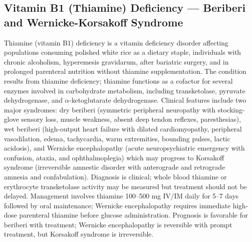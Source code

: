\subsection{Vitamin B1 (Thiamine) Deficiency --- Beriberi and Wernicke-Korsakoff Syndrome}
\label{sec:Vitamin B1 Deficiency}
Thiamine (vitamin B1) deficiency is a vitamin deficiency disorder affecting populations consuming polished white rice as a dietary staple, individuals with chronic alcoholism, hyperemesis gravidarum, after bariatric surgery, and in prolonged parenteral nutrition without thiamine supplementation. The condition results from thiamine deficiency; thiamine functions as a cofactor for several enzymes involved in carbohydrate metabolism, including transketolase, pyruvate dehydrogenase, and $\alpha$-ketoglutarate dehydrogenase. Clinical features include two major syndromes: dry beriberi (symmetric peripheral neuropathy with stocking-glove sensory loss, muscle weakness, absent deep tendon reflexes, paresthesias), wet beriberi (high-output heart failure with dilated cardiomyopathy, peripheral vasodilation, edema, tachycardia, warm extremities, bounding pulses, lactic acidosis), and Wernicke encephalopathy (acute neuropsychiatric emergency with confusion, ataxia, and ophthalmoplegia) which may progress to Korsakoff syndrome (irreversible amnestic disorder with anterograde and retrograde amnesia and confabulation). Diagnosis is clinical; whole blood thiamine or erythrocyte transketolase activity may be measured but treatment should not be delayed. Management involves thiamine 100--500 mg IV/IM daily for 5--7 days followed by oral maintenance; Wernicke encephalopathy requires immediate high-dose parenteral thiamine before glucose administration. Prognosis is favorable for beriberi with treatment; Wernicke encephalopathy is reversible with prompt treatment, but Korsakoff syndrome is irreversible.

